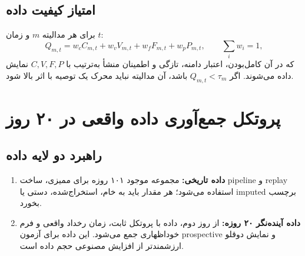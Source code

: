 \documentclass[11pt,a4paper]{article}
\begin{document}
\subsection{امتیاز کیفیت داده}
برای هر مدالیته $m$ و زمان $t$:
\begin{equation}
Q_{m,t}=w_c C_{m,t}+w_v V_{m,t}+w_f F_{m,t}+w_p P_{m,t},
\qquad \sum_i w_i=1,
\end{equation}
که در آن کامل‌بودن، اعتبار دامنه، تازگی و اطمینان منشأ به‌ترتیب با $C,V,F,P$ نمایش داده می‌شوند. اگر $Q_{m,t}<\tau_m$ باشد، آن مدالیته نباید محرک یک توصیه با اثر بالا شود.

\section{پروتکل جمع‌آوری داده واقعی در ۲۰ روز}

\subsection{راهبرد دو لایه داده}
\begin{enumerate}
  \item \textbf{داده تاریخی:} مجموعه موجود ۱۰۱ روزه برای ممیزی، ساخت pipeline و replay استفاده می‌شود؛ هر مقدار باید به خام، استخراج‌شده، دستی یا imputed برچسب بخورد.
  \item \textbf{داده آینده‌نگر ۲۰ روزه:} از روز دوم، داده با پروتکل ثابت، زمان رخداد واقعی و فرم خوداظهاری جمع می‌شود. این داده برای آزمون prospective و نمایش دوقلو ارزشمندتر از افزایش مصنوعی حجم داده است.
\end{enumerate}
\end{document}
